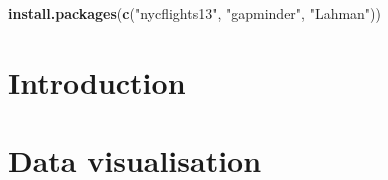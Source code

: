 \documentclass[]{book}
\newenvironment{Shaded}{\begin{snugshade}}{\end{snugshade}}
\newcommand{\KeywordTok}[1]{\textcolor[rgb]{0.13,0.29,0.53}{\textbf{#1}}}
\newcommand{\NormalTok}[1]{#1}
\newcommand{\StringTok}[1]{\textcolor[rgb]{0.31,0.60,0.02}{#1}}
\begin{document}
\begin{Shaded}
\begin{Highlighting}[]
\KeywordTok{install.packages}\NormalTok{(}\KeywordTok{c}\NormalTok{(}\StringTok{"nycflights13"}\NormalTok{, }\StringTok{"gapminder"}\NormalTok{, }\StringTok{"Lahman"}\NormalTok{))}
\end{Highlighting}
\end{Shaded}

\hypertarget{introduction}{%
\chapter{Introduction}\label{introduction}}

\hypertarget{data-visualisation}{%
\chapter{Data visualisation}\label{data-visualisation}}
\end{document}
